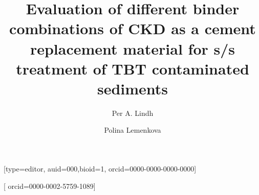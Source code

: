 \documentclass[a4paper,fleqn]{cas-dc}
\begin{document}
\let\WriteBookmarks\relax
\def\floatpagepagefraction{1}
\def\textpagefraction{.001}

\title[mode = title]{Evaluation of different binder combinations of CKD as a cement replacement material for s/s treatment of TBT contaminated sediments}                      




\author[1]{Per A. Lindh}[type=editor,
                        auid=000,bioid=1,
                        orcid=0000-0000-0000-0000]
\cormark[1]
\fnmark[1]


\address[1]{Swedish Transport Administration. Lund, Sweden}

\author[2]{Polina Lemenkova}[
	orcid=0000-0002-5759-1089]

\cormark[2]
\fnmark[2]


\address[2]{Schmidt Institute of Physics of the Earth, Russian Academy of Sciences. Department of Natural Disasters, Anthropogenic Hazards and Seismicity of the Earth. Laboratory of Regional Geophysics and Natural Disasters. Bolshaya Gruzinskaya St, 10/1, Moscow, 123995, Russia}


\end{document}

